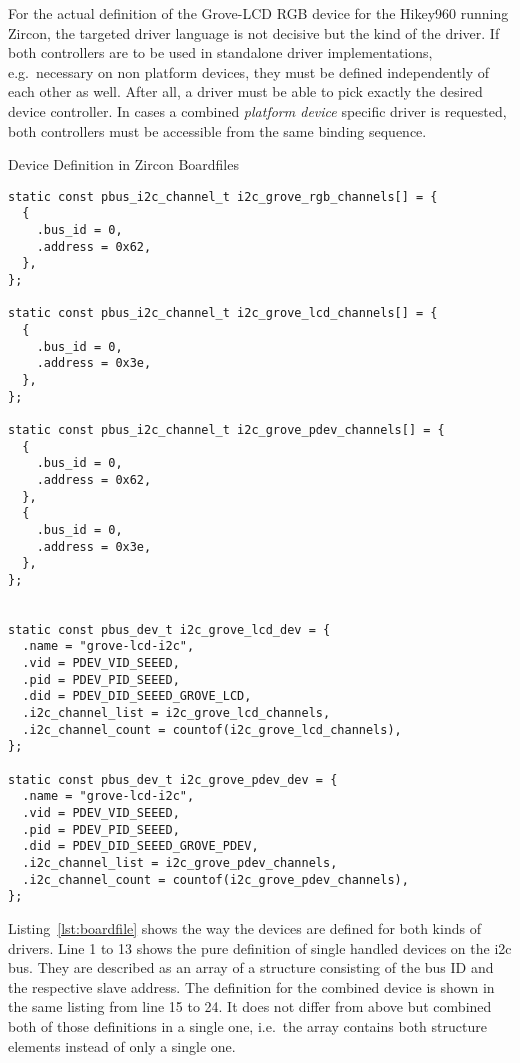 For the actual definition of the Grove-LCD RGB device for the Hikey960 running Zircon, the targeted driver language is not decisive but the kind of the driver.
If both controllers are to be used in standalone driver implementations, e.g.\ necessary on non platform devices, they must be defined independently of each other as well.
After all, a driver must be able to pick exactly the desired device controller.
In cases a combined \textit{platform device} specific driver is requested, both controllers must be accessible from the same binding sequence.
%
\begin{listing} [H]
\caption{Device Definition in Zircon Boardfiles}
\label{lst:boardfile}
\begin{verbatim}
static const pbus_i2c_channel_t i2c_grove_rgb_channels[] = {
  {
    .bus_id = 0,
    .address = 0x62,
  },
};

static const pbus_i2c_channel_t i2c_grove_lcd_channels[] = {
  {
    .bus_id = 0,
    .address = 0x3e,
  },
}; 

static const pbus_i2c_channel_t i2c_grove_pdev_channels[] = {
  {
    .bus_id = 0,
    .address = 0x62,
  },
  {
    .bus_id = 0,
    .address = 0x3e,
  },
};


static const pbus_dev_t i2c_grove_lcd_dev = {
  .name = "grove-lcd-i2c",
  .vid = PDEV_VID_SEEED,              
  .pid = PDEV_PID_SEEED,              
  .did = PDEV_DID_SEEED_GROVE_LCD,    
  .i2c_channel_list = i2c_grove_lcd_channels,
  .i2c_channel_count = countof(i2c_grove_lcd_channels),
}; 

static const pbus_dev_t i2c_grove_pdev_dev = {
  .name = "grove-lcd-i2c",
  .vid = PDEV_VID_SEEED,              
  .pid = PDEV_PID_SEEED,              
  .did = PDEV_DID_SEEED_GROVE_PDEV,  
  .i2c_channel_list = i2c_grove_pdev_channels,
  .i2c_channel_count = countof(i2c_grove_pdev_channels),
};
\end{verbatim}
\end{listing}
%
Listing~\ref{lst:boardfile} shows the way the devices are defined for both kinds of drivers.
Line 1 to 13 shows the pure definition of single handled devices on the \ac{i2c} bus.
They are described as an array of a structure consisting of the bus ID and the respective slave address.
The definition for the combined device is shown in the same listing from line 15 to 24. 
It does not differ from above but combined both of those definitions in a single one, i.e.\ the array contains both structure elements instead of only a single one.
